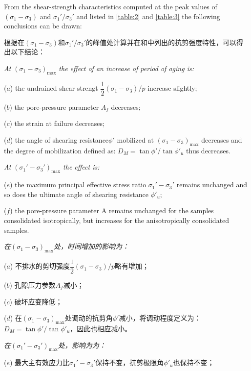 \begin{paracol}{2}
    \switchcolumn*

    From the shear-strength characteristics computed at the peak values of $(\sigma_1-\sigma_3)$ and $\sigma_1'/\sigma_3'$ and listed in \autoref{table:2} and \autoref{table:3} the following conclusions can be drawn: 

    \switchcolumn
       
    根据在$(\sigma_1-\sigma_3)$和$\sigma_1'/\sigma_3'$的峰值处计算并在和中列出的抗剪强度特性，可以得出以下结论：
     
    \switchcolumn*
    
    \noindent \emph{At $(\sigma_1-\sigma_3)_{\max}$ the effect of an increase of period of aging is:}
    
    ($a$) the undrained shear strengt $\dfrac{1}{2}(\sigma_1-\sigma_3)/p$ increase slightly; 

    ($b$) the pore-pressure parameter $A_f$ decreases; 

    ($c$) the strain at failure decreases; 

    ($d$) the angle of shearing resistance$\phi'$ mobilized at $(\sigma_1-\sigma_3)_{\max}$ decreases and the degree of mobilization defined as: $D_M=\tan\phi'/\tan\phi'_u$ thus decreases.

    \noindent \emph{At $(\sigma_1'-\sigma_3')_{\max}$ the effect is:}

    ($e$) the maximum principal effective stress ratio $\sigma_1'-\sigma_3'$ remains unchanged and so does the ultimate angle of shearing resistance $\phi'_u$;

    ($f$) the pore-pressure parameter A remains unchanged for the samples consolidated isotropically, but increases for the anisotropically consolidated samples.

    \switchcolumn

    \noindent \emph{在$(\sigma_1-\sigma_3)_{\max}$处，时间增加的影响为：}

    ($a$) 不排水的剪切强度$\dfrac{1}{2}(\sigma_1-\sigma_3)/p$略有增加；  

    ($b$) 孔隙压力参数$A_f$减小；  

    ($c$) 破坏应变降低；

    ($d$) 在$(\sigma_1-\sigma_3)_{\max}$处调动的抗剪角$\phi'$减小，将调动程度定义为：$D_M=\tan\phi'/\tan\phi'_u$，因此也相应减小。

    \noindent \emph{在$(\sigma_1'-\sigma_3')_{\max}$处，影响为为：}

   ($e$) 最大主有效应力比$\sigma_1'-\sigma_3'$保持不变，抗剪极限角$\phi'_u$也保持不变；


\end{paracol}
